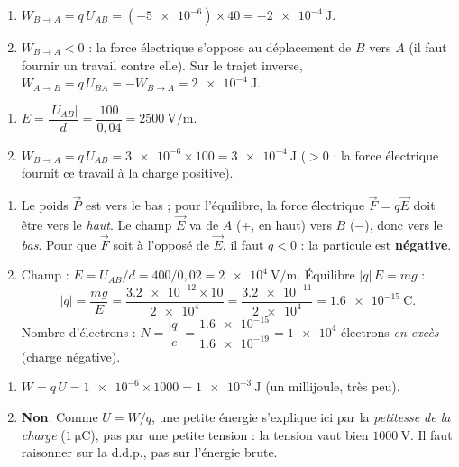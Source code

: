 \documentclass[11pt,a4paper]{article}
\newcommand{\vv}[1]{\vec{#1}}\newcommand{\ds}{\displaystyle}
\begin{document}

\begin{corrige}
\begin{enumerate}[label=\alph*)]
  \item $W_{B\to A} = q\,U_{AB} = (\num{-5e-6})\times 40 = \SI{-2e-4}{\joule}$.
  \item $W_{B\to A} < 0$ : la force électrique s'oppose au déplacement de $B$ vers $A$ (il faut
        fournir un travail contre elle). Sur le trajet inverse,
        $W_{A\to B} = q\,U_{BA} = -W_{B\to A} = \SI{+2e-4}{\joule}$.
\end{enumerate}
\end{corrige}

\begin{corrige}
\begin{enumerate}[label=\alph*)]
  \item $E = \dfrac{|U_{AB}|}{d} = \dfrac{100}{0{,}04} = \SI{2500}{\volt\per\metre}$.
  \item $W_{B\to A} = q\,U_{AB} = \num{3e-6}\times 100 = \SI{3e-4}{\joule}$ ($>0$ : la force
        électrique fournit ce travail à la charge positive).
\end{enumerate}
\end{corrige}

\begin{corrige}
\begin{enumerate}[label=\alph*)]
  \item Le poids $\vv{P}$ est vers le bas ; pour l'équilibre, la force électrique $\vv{F}=q\vv{E}$
        doit être vers le \emph{haut}. Le champ $\vv{E}$ va de $A$ ($+$, en haut) vers $B$ ($-$),
        donc vers le \emph{bas}. Pour que $\vv{F}$ soit à l'opposé de $\vv{E}$, il faut
        $\boxed{q<0}$ : la particule est \textbf{négative}.
  \item Champ : $E = U_{AB}/d = 400/0{,}02 = \SI{2e4}{\volt\per\metre}$. Équilibre $|q|\,E = m g$ :
        \[ |q| = \frac{m g}{E} = \frac{\num{3.2e-12}\times 10}{\num{2e4}}
               = \frac{\num{3.2e-11}}{\num{2e4}} = \SI{1.6e-15}{\coulomb}. \]
        Nombre d'électrons : $N = \dfrac{|q|}{e} = \dfrac{\num{1.6e-15}}{\num{1.6e-19}} = \num{1e4}$
        électrons \emph{en excès} (charge négative).
\end{enumerate}
\end{corrige}

\begin{corrige}
\begin{enumerate}[label=\alph*)]
  \item $W = q\,U = \num{1e-6}\times 1000 = \SI{1e-3}{\joule}$ (un millijoule, très peu).
  \item \textbf{Non}. Comme $U = W/q$, une petite énergie s'explique ici par la \emph{petitesse de
        la charge} ($\SI{1}{\micro\coulomb}$), pas par une petite tension : la tension vaut bien
        $\SI{1000}{\volt}$. Il faut raisonner sur la d.d.p., pas sur l'énergie brute.
\end{enumerate}
\end{corrige}
\end{document}
